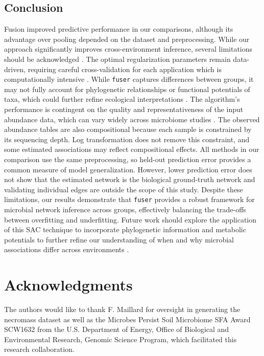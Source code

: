 \documentclass[]{Liebert_Author_revised}
\providecommand{\DIFadd}[1]{{\ifmmode\else\leavevmode\fi\color{blue}#1}} %
\providecommand{\DIFaddbegin}{} %
\providecommand{\DIFaddend}{} %
\begin{document}
\subsection{Conclusion}
 \DIFaddbegin \DIFadd{Fusion improved predictive performance in our comparisons, although its advantage over pooling depended on the dataset and preprocessing.
}\DIFaddend While our approach significantly improves cross-environment inference, several limitations should be acknowledged \citep{dohlman2019interactome}.
 \DIFaddbegin \DIFadd{The }\DIFaddend optimal regularization parameters remain data-driven, requiring careful cross-validation for each application which is computationally intensive \citep{hocking2024soaksameotherallkfoldcrossvalidation, agyapong2025cross}.
 \DIFaddbegin \DIFadd{While \texttt{fuser} captures differences between groups}\DIFaddend , it may not fully account for phylogenetic relationships or functional potentials of taxa, which could further refine ecological interpretations \citep{liu2024phylo,kunin2005phylogenetic,Douglas2020}.
 \DIFaddbegin \DIFadd{The }\DIFaddend algorithm's performance is contingent on the quality and representativeness of the input abundance data, which can vary widely across microbiome studies \citep{Sinha2017,McLaren2019,Gibbons2018}.
\DIFaddbegin \DIFadd{The observed abundance tables are also compositional because each sample is constrained by its sequencing depth. 
Log transformation does not remove this constraint, and some estimated associations may reflect compositional effects. 
All methods in our comparison use the same preprocessing, so held-out prediction error provides a common measure of model generalization. 
However, lower prediction error does not show that the estimated network is the biological ground-truth network and validating individual edges are outside the scope of this study.
}\DIFaddend Despite these limitations, our results demonstrate that \texttt{fuser} provides a robust framework for microbial network inference across  \DIFaddbegin \DIFadd{groups}\DIFaddend , effectively balancing the trade-offs between overfitting and underfitting.
Future work should explore the application of this SAC technique to incorporate phylogenetic information and metabolic potentials to further refine our understanding of when and why microbial associations differ across environments \citep{liu2024phylo,dohlman2019interactome}.


\section*{Acknowledgments}
The authors would like to thank F. Maillard for oversight in generating the necromass dataset as well as the Microbes Persist Soil Microbiome SFA Award SCW1632 from the U.S. Department of Energy, Office of Biological and Environmental Research, Genomic Science Program, which facilitated this research collaboration.
\end{document}
